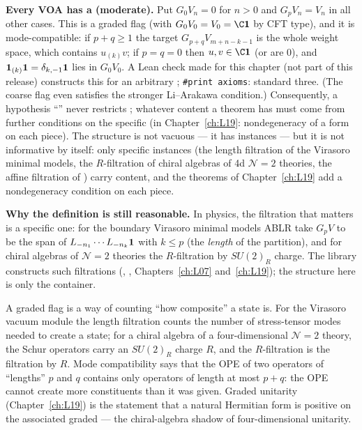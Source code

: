 \begin{warning}
\textbf{Every VOA has a  (moderate).} Put $G_0V_n = 0$ for $n>0$ and $G_pV_n = V_n$
in all other cases. This is a graded flag (with $G_0V_0 = V_0 = \C\lelevenvac$ by CFT type), and it is
mode-compatible: if $p+q\ge1$ the target $G_{p+q}V_{m+n-k-1}$ is the whole weight space, which
contains $u_{(k)}v$; if $p=q=0$ then $u,v\in\C\lelevenvac$ (or are $0$), and
$\mathbf{1}_{(k)}\mathbf{1} = \delta_{k,-1}\mathbf{1}$ lies in $G_0V_0$. A Lean check made for this chapter (not part of this release) constructs this
 for an arbitrary ; \texttt{\#print axioms}: standard three. (The coarse
flag even satisfies the stronger Li--Arakawa condition.) Consequently, a hypothesis
``'' never restricts ; whatever content a theorem has must come from
further conditions on the specific  (in Chapter~\ref{ch:L19}: nondegeneracy of a form on each
piece). The structure is not vacuous --- it has instances --- but it is not informative by itself: only specific instances (the
length filtration of the Virasoro minimal models, the $R$-filtration of chiral algebras of 4d $\mathcal N=2$ theories, the affine
filtration of ) carry content, and the theorems of Chapter~\ref{ch:L19} add a
nondegeneracy condition on each piece.
\end{warning}

\textbf{Why the definition is still reasonable.} In physics, the filtration that matters is a specific
one: for the boundary Virasoro minimal models ABLR take $G_pV$ to be the span of
$L_{-n_1}\cdots L_{-n_k}\mathbf{1}$ with $k\le p$ (the \emph{length} of the partition), and for chiral
algebras of $\mathcal N=2$ theories the $R$-filtration by $SU(2)_R$ charge. The library constructs such
filtrations (,
, Chapters~\ref{ch:L07} and~\ref{ch:L19}); the structure here is
only the container.

\begin{physics}
A graded flag is a way of counting ``how composite'' a state is. For the Virasoro vacuum module the
length filtration counts the number of stress-tensor modes needed to create a state; for a chiral
algebra of a four-dimensional $\mathcal N=2$ theory, the Schur operators carry an $SU(2)_R$ charge $R$,
and the $R$-filtration is the filtration by $R$. Mode compatibility says that the OPE of two operators
of ``lengths'' $p$ and $q$ contains only operators of length at most $p+q$: the OPE cannot create more
constituents than it was given. Graded unitarity (Chapter~\ref{ch:L19}) is the statement that a natural
Hermitian form is positive on the associated graded --- the chiral-algebra shadow of four-dimensional
unitarity.
\end{physics}

